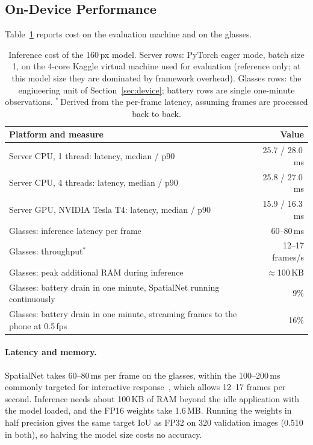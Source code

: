 \subsection{On-Device Performance}\label{sec:ondevice}

Table~\ref{tab:device} reports cost on the evaluation machine and on the glasses.

\begin{table}[t]
  \caption{Inference cost of the 160\,px model. Server rows: PyTorch eager mode, batch size 1, on the 4-core Kaggle virtual machine used for evaluation (reference only; at this model size they are dominated by framework overhead). Glasses rows: the engineering unit of Section~\ref{sec:device}; battery rows are single one-minute observations. $^\ast$\,Derived from the per-frame latency, assuming frames are processed back to back.}
  \label{tab:device}
  \footnotesize
  \begin{tabular}{lr}
    \toprule
    Platform and measure & Value \\
    \midrule
    Server CPU, 1 thread: latency, median / p90 & 25.7 / 28.0\,ms \\
    Server CPU, 4 threads: latency, median / p90 & 25.8 / 27.0\,ms \\
    Server GPU, NVIDIA Tesla T4: latency, median / p90 & 15.9 / 16.3\,ms \\
    \midrule
    Glasses: inference latency per frame & 60--80\,ms \\
    Glasses: throughput$^\ast$ & 12--17 frames/s \\
    Glasses: peak additional RAM during inference & ${\approx}$100\,KB \\
    Glasses: battery drain in one minute, SpatialNet running continuously & 9\% \\
    Glasses: battery drain in one minute, streaming frames to the phone at 0.5\,fps & 16\% \\
    \bottomrule
  \end{tabular}
\end{table}

\paragraph{Latency and memory.} SpatialNet takes 60--80\,ms per frame on the glasses, within the 100--200\,ms commonly targeted for interactive response~\cite{miller1968response,card1991information}, which allows 12--17 frames per second. Inference needs about 100\,KB of RAM beyond the idle application with the model loaded, and the FP16 weights take 1.6\,MB. Running the weights in half precision gives the same target IoU as FP32 on 320 validation images (0.510 in both), so halving the model size costs no accuracy.

